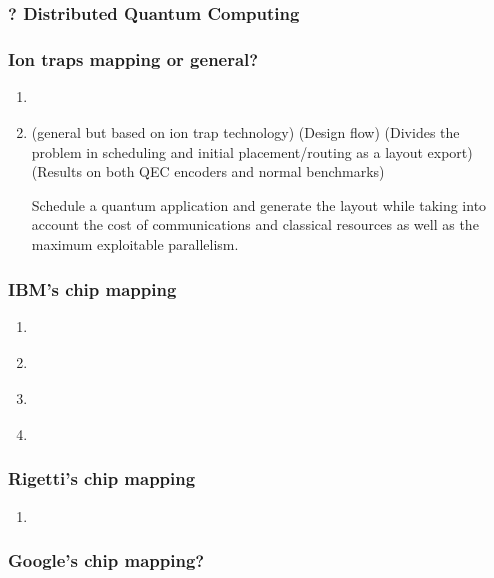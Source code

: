 \documentclass[11pt]{article}
\begin{document}
\subsubsection{? Distributed Quantum Computing}
\label{sec:org9b10a0e}

\cite{brierley15:effic_quant}

\subsubsection{Ion traps mapping or general?}
\label{sec:orgfccf446}

\begin{enumerate}
\item \cite{Dousti_2012}
\label{sec:org94bec42}


\item \cite{Yazdani_2013} (general but based on ion trap technology) (Design flow) (Divides the problem in scheduling and initial placement/routing as a layout export) (Results on both QEC encoders and normal benchmarks)
\label{sec:org6c8d8d7}

Schedule a quantum application and generate the layout while taking into account the cost of communications and classical resources as well as the maximum exploitable parallelism.
\end{enumerate}

\subsubsection{IBM's chip mapping}
\label{sec:orga388a7b}
\begin{enumerate}
\item \cite{zulehner17:effic_method_mappin_quant_circuit}
\label{sec:orge2404e2}
\item \cite{Siraichi_2018}
\label{sec:orgc9f4321}
\item \cite{mckay18:qiskit_backen_specif_openq_openp_exper}
\label{sec:org3d35794}
\item \cite{Dueck_2018}
\label{sec:orgf3b8745}
\end{enumerate}
\subsubsection{Rigetti's chip mapping}
\label{sec:org57fd48c}
\begin{enumerate}
\item \cite{Venturelli_2018}
\label{sec:org637d554}
\end{enumerate}
\subsubsection{Google's chip mapping?}
\label{sec:orgd395234}
\end{document}
